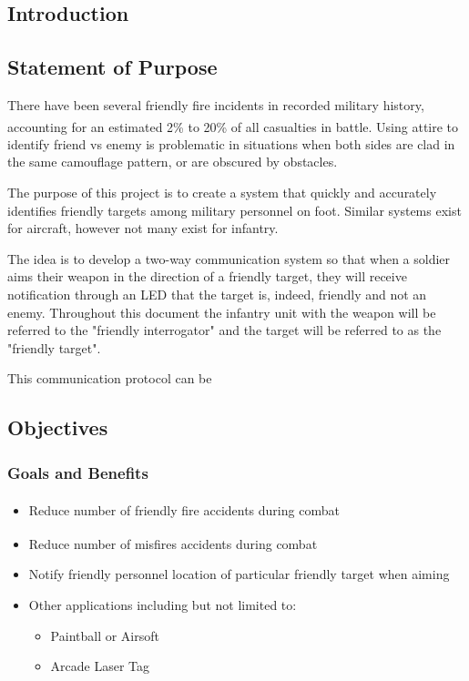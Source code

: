 \documentclass[letterpaper,10pt]{article}
\newcommand{\buildtoc}{
	\clearpage
	\singlespacing
	\tableofcontents
	\onehalfspacing
}
\begin{document}
\maketitle
\pagestyle{fancy}
\begin{spacing}{1.15}


\color{black}
\buildtoc
{}
\clearpage
\setcounter{page}{1}

\section{Introduction}
\subsection{Statement of Purpose}
There have been several friendly fire incidents in recorded military history, accounting for an estimated 2\% to 20\% of all casualties in battle\textsuperscript{\cite{USArmy}}. Using attire to identify friend vs enemy is problematic in situations when both sides are clad in the same camouflage pattern, or are obscured by obstacles.

The purpose of this project is to create a system that quickly and accurately identifies friendly targets among military personnel on foot. Similar systems exist for aircraft, however not many exist for infantry.

The idea is to develop a two-way communication system so that when a soldier aims their weapon in the direction of a friendly target, they will receive notification through an LED that the target is, indeed, friendly and not an enemy. Throughout this document the infantry unit with the weapon will be referred to the "friendly interrogator" and the target will  be referred to as the "friendly target". 

This communication protocol can be 
\subsection{Objectives}
\subsubsection{Goals and Benefits}
\begin{itemize}
	\item Reduce number of friendly fire accidents during combat \textsuperscript{\cite{Garrison}}
	\item Reduce number of misfires accidents during combat \textsuperscript{\cite{Garrison}}
	\item Notify friendly personnel location of particular friendly target when aiming
	\item Other applications including but not limited to:
	\begin{itemize}
		\item Paintball or Airsoft
		\item Arcade Laser Tag
	\end{itemize}
\end{itemize}

\end{spacing}
\end{document}
